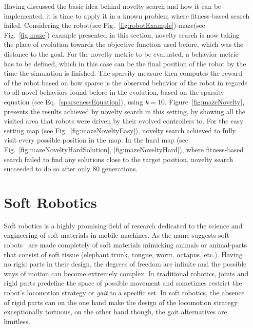 Having discussed the basic idea behind novelty search and how it can be implemented, it is time to apply it in a known problem where fitness-based search failed. Considering the robot(see Fig.~\ref{fig:robotExample})-maze(see Fig.~\ref{fig:maze}) example presented in this section, novelty search is now taking the place of evolution towards the objective function used before, which was the distance to the goal. For the novelty metric to be evaluated, a behavior metric has to be defined, which in this case can be the final position of the robot by the time the simulation is finished. The sparsity measure then computes the reward of the robot based on how sparse is the observed behavior of the robot in regards to all novel behaviors found before in the evolution, based on the sparsity equation (see Eq.~\ref{sparsenessEquation}), using $k = 10$. Figure~\ref{fig:mazeNovelty}, presents the results achieved by novelty search in this setting, by showing all the visited area that robots were driven by their evolved controllers to. For the easy setting map (see Fig.~\ref{fig:mazeNoveltyEasy}), novelty search achieved to fully visit every possible position in the map. In the hard map (see Fig.~\ref{fig:mazeNoveltyHardSolution}, \ref{fig:mazeNoveltyHard}), where fitness-based search failed to find any solutions close to the target position, novelty search succeeded to do so after only $80$ generations.



\section{Soft Robotics}
Soft robotics is a highly promising field of research dedicated to the science and engineering of soft materials in mobile machines. As the name suggests soft robots~\citep{trivedi2008soft, pfeifer2012challenges} are made completely of soft materials mimicking animals or animal-parts that consist of soft tissue (elephant trunk, tongue, worm, octapus, etc.). Having no rigid parts in their design, the degrees of freedom are infinite and the possible ways of motion can become extremely complex. In traditional robotics, joints and rigid parts predefine the space of possible movement and sometimes restrict the robot's locomotion strategy or \emph{gait} to a specific set. In soft robotics, the absence of rigid parts can on the one hand make the design of the locomotion strategy exceptionally tortuous, on the other hand though, the gait alternatives are limitless.

